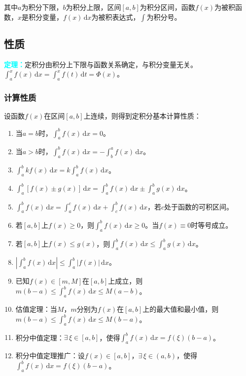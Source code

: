 \documentclass[UTF8, 12pt]{ctexart}
\begin{document}
其中$a$为积分下限，$b$为积分上限，区间$[a,b]$为积分区间，函数$f(x)$为被积函数，$x$是积分变量，$f(x)\,\textrm{d}x$为被积表达式，$\int$为积分号。

\subsection{性质}

\textcolor{aqua}{\textbf{定理：}}定积分由积分上下限与函数关系确定，与积分变量无关。$\int_a^xf(x)\,\textrm{d}x=\int_a^xf(t)\,\textrm{d}t=\varPhi(x)$。

\subsubsection{计算性质}

设函数$f(x)$在区间$[a,b]$上连续，则得到定积分基本计算性质：

\begin{enumerate}
    \item 当$a=b$时，$\int_a^bf(x)\,\textrm{d}x=0$。
    \item 当$a>b$时，$\int_a^bf(x)\,\textrm{d}x=-\int_b^af(x)\,\textrm{d}x$。
    \item $\int_a^bkf(x)\,\textrm{d}x=k\int_a^bf(x)\,\textrm{d}x$。
    \item $\int_a^b[f(x)\pm g(x)]\,\textrm{d}x=\int_a^bf(x)\,\textrm{d}x\pm\int_a^bg(x)\,\textrm{d}x$。
    \item $\int_a^bf(x)\,\textrm{d}x=\int_a^cf(x)\,\textrm{d}x+\int_c^bf(x)\,\textrm{d}x$，若$c$处于函数的可积区间。
    \item 若$[a,b]$上$f(x)\geqslant 0$，则$\int_a^bf(x)\,\textrm{d}x\geqslant 0$。当$f(x)\equiv0$时等号成立。
    \item 若$[a,b]$上$f(x)\leqslant g(x)$，则$\int_a^bf(x)\,\textrm{d}x\leqslant\int_a^bg(x)\,\textrm{d}x$。
    \item $\left\vert\int_a^bf(x)\,\textrm{d}x\right\vert\leqslant\int_a^b\vert f(x)\vert\,\textrm{d}x$。
    \item 已知$f(x)\in[m,M]$在$[a,b]$上成立，则$m(b-a)\leqslant\int_a^bf(x)\,\textrm{d}x\leqslant M(a-b)$。
    \item 估值定理：当$M$，$m$分别为$f(x)$在$[a,b]$上的最大值和最小值，则$m(b-a)\leqslant\int_a^bf(x)\,\textrm{d}x\leqslant M(b-a)$。
    \item 积分中值定理：$\exists\,\xi\in[a,b]$，使得$\int_a^bf(x)\,\textrm{d}x=f(\xi)(b-a)$。
    \item 积分中值定理推广：设$f(x)\in[a,b]$，$\exists\,\xi\in(a,b)$，使得$\int_a^bf(x)\,\textrm{d}x=f(\xi)(b-a)$。
\end{enumerate}
\end{document}
